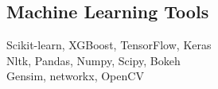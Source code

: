 \subsection{Machine Learning Tools}
Scikit-learn, XGBoost, TensorFlow, Keras \\
Nltk, Pandas, Numpy, Scipy, Bokeh \\
Gensim, networkx, OpenCV \\

\sectionspace %

